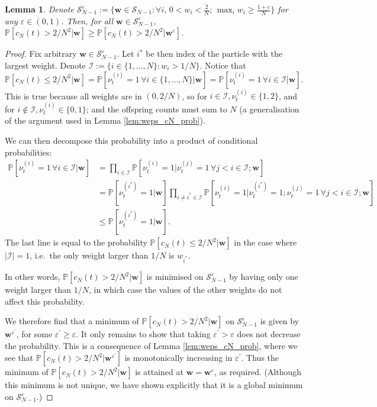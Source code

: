 \documentclass{article}
\newtheorem{lemma}{Lemma}
\newcommand{\PR}{\mathbb{P}}
\begin{document}
\begin{lemma}
Denote $\mathcal{S}_{N-1}^\varepsilon := \{ \mathbf{w} \in \mathcal{S}_{N-1} :  \forall i, \, 0 <w_i <\frac{2}{N} ;\, \max_i w_i \geq \frac{1 + \varepsilon}{N} \}$ for any $\varepsilon \in (0, 1)$.
Then, for all $\mathbf{w} \in \mathcal{S}_{N-1}^\varepsilon$, 
$\PR[c_N(t) > 2/N^2 | \mathbf{w} ] \geq \PR[c_N(t) > 2/N^2 | \mathbf{w}^\varepsilon ]$.
\end{lemma}

\begin{proof}
Fix arbitrary $\mathbf{w} \in \mathcal{S}_{N-1}^\varepsilon$. Let $i^*$ be then index of the particle with the largest weight.
Denote $\mathcal{I} := \{i \in \{1,\dots,N\} : w_i > 1/N \}$.
Notice that 
\begin{equation*}
\PR[ c_N(t) \leq 2/N^2 | \mathbf{w} ] 
= \PR[ \nu_t^{(i)} =1 \,\forall i\in\{1,\dots,N\} | \mathbf{w}] 
= \PR[ \nu_t^{(i)} =1 \,\forall i\in \mathcal{I} | \mathbf{w}] .
\end{equation*}
This is true because all weights are in $(0, 2/N)$, so for $i \in \mathcal{I}, \nu_t^{(i)} \in \{1,2\}$, and for $i \notin \mathcal{I}, \nu_t^{(i)} \in \{0,1\}$; and the offspring counts must sum to $N$ (a generalisation of the argument used in Lemma \ref{lem:weps_cN_prob}).

We can then decompose this probability into a product of conditional probabilities:
\begin{align*}
\PR[ \nu_t^{(i)} =1 \,\forall i\in \mathcal{I} | \mathbf{w}]
&= \prod_{i \in \mathcal{I}} \PR[ \nu_t^{(i)} =1 | \nu_t^{(j)}=1 \,\forall j <i \in \mathcal{I}; \mathbf{w}] \\
&= \PR[\nu_t^{(i^*)} =1 | \mathbf{w}] \prod_{i \neq i^* \in \mathcal{I}} \PR[ \nu_t^{(i)} =1 | \nu_t^{(i^*)}=1; \nu_t^{(j)}=1 \,\forall j <i \in \mathcal{I}; \mathbf{w}] \\
&\leq \PR[\nu_t^{(i^*)} =1 | \mathbf{w}] .
\end{align*}
The last line is equal to the probability $\PR[ c_N(t) \leq 2/N^2 | \mathbf{w} ] $ in the case where $|\mathcal{I}| =1$, i.e.\ the only weight larger than $1/N$ is $w_{i^*}$.

In other words, $\PR[ c_N(t) > 2/N^2 | \mathbf{w} ]$ is minimised on $\mathcal{S}_{N-1}^\varepsilon$ by having only one weight larger than $1/N$, in which case the values of the other weights do not affect this probability. 

We therefore find that a minimum of $\PR[ c_N(t) > 2/N^2 | \mathbf{w} ]$ on $\mathcal{S}_{N-1}^\varepsilon$ is given by $\mathbf{w}^{\varepsilon^\prime}$, for some $\varepsilon^\prime \geq \varepsilon$. 
It only remains to show that taking $\varepsilon^\prime > \varepsilon$ does not decrease the probability. This is a consequence of Lemma \ref{lem:weps_cN_prob}, where we see that $\PR[ c_N(t) > 2/N^2 | \mathbf{w}^{\varepsilon^\prime}]$ is monotonically increasing in $\varepsilon^\prime$.
Thus the minimum of $\PR[ c_N(t) > 2/N^2 | \mathbf{w} ]$ is attained at $\mathbf{w} = \mathbf{w}^\varepsilon$, as required. (Although this minimum is not unique, we have shown explicitly that it is a global minimum on $\mathcal{S}_{N-1}^\varepsilon$.)
\end{proof}
\end{document}
